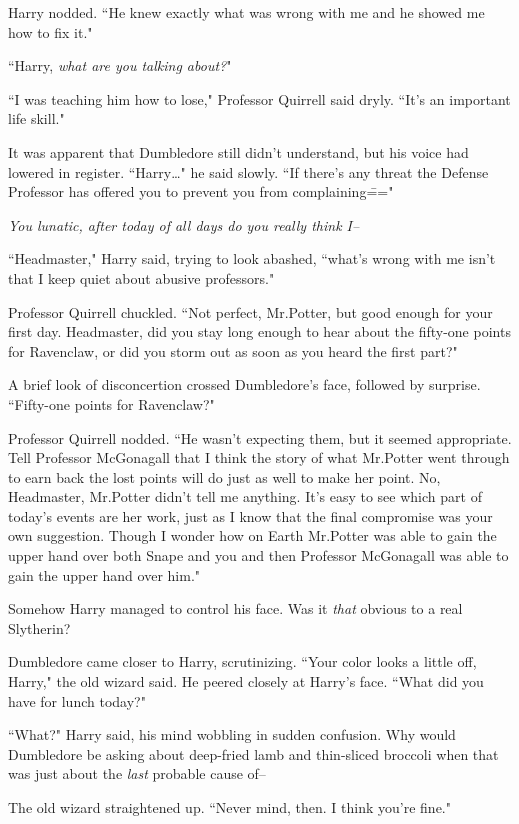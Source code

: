 Harry nodded. ``He knew exactly what was wrong with me and he showed me how to fix it."

``Harry, \emph{what are you talking about?}"

``I was teaching him how to lose," Professor Quirrell said dryly. ``It's an important life skill."

It was apparent that Dumbledore still didn't understand, but his voice had lowered in register. ``Harry{\ldots}" he said slowly. ``If there's any threat the Defense Professor has offered you to prevent you from complaining\==="

\emph{You lunatic, after today of all days do you really think I\---}

``Headmaster," Harry said, trying to look abashed, ``what's wrong with me isn't that I keep quiet about abusive professors."

Professor Quirrell chuckled. ``Not perfect, Mr.\?Potter, but good enough for your first day. Headmaster, did you stay long enough to hear about the fifty-one points for Ravenclaw, or did you storm out as soon as you heard the first part?"

A brief look of disconcertion crossed Dumbledore's face, followed by surprise. ``Fifty-one points for Ravenclaw?"

Professor Quirrell nodded. ``He wasn't expecting them, but it seemed appropriate. Tell Professor McGonagall that I think the story of what Mr.\?Potter went through to earn back the lost points will do just as well to make her point. No, Headmaster, Mr.\?Potter didn't tell me anything. It's easy to see which part of today's events are her work, just as I know that the final compromise was your own suggestion. Though I wonder how on Earth Mr.\?Potter was able to gain the upper hand over both Snape and you and then Professor McGonagall was able to gain the upper hand over him."

Somehow Harry managed to control his face. Was it \emph{that} obvious to a real Slytherin?

Dumbledore came closer to Harry, scrutinizing. ``Your color looks a little off, Harry," the old wizard said. He peered closely at Harry's face. ``What did you have for lunch today?"

``What?" Harry said, his mind wobbling in sudden confusion. Why would Dumbledore be asking about deep-fried lamb and thin-sliced broccoli when that was just about the \emph{last} probable cause of\---

The old wizard straightened up. ``Never mind, then. I think you're fine."

